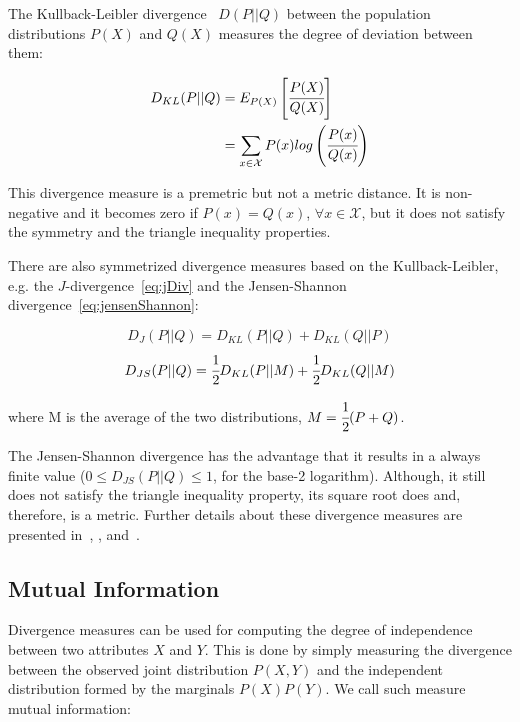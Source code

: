 The Kullback-Leibler divergence~\citep{Kullback51klDivergence} $D(P||Q)$ between the population
distributions $P(X)$ and $Q(X)$ measures the degree of deviation between them:

\begin{equation}
\begin{split}
 D_{KL}(P||Q)&=E_{P(X)}\left[\cfrac{P(X)}{Q(X)}\right] \\
 &=\sum_{x \in \mathcal{X}}P(x)log\left(\cfrac{P(x)}{Q(x)}\right)
\end{split} 
\end{equation}

This divergence measure is a premetric but not a metric distance. It is non-negative and it becomes zero if
$P(x)=Q(x)$,
$\forall x \in \mathcal{X}$, but it does not satisfy the symmetry and the triangle inequality properties.

There are also symmetrized divergence measures based on the Kullback-Leibler, e.g. the $J$-divergence~\ref{eq:jDiv} and
the Jensen-Shannon divergence~\ref{eq:jensenShannon}:

\begin{equation} \label{eq:jDiv}
  D_{J}(P||Q) = D_{KL}(P||Q) + D_{KL}(Q||P)
\end{equation}
\begin{equation} \label{eq:jensenShannon}
  D_{JS}(P||Q) = \cfrac{1}{2}D_{KL}(P||M) + \cfrac{1}{2}D_{KL}(Q||M)
\end{equation}

where M is the average of the two distributions, $M=\cfrac{1}{2}(P+Q)$.

The Jensen-Shannon divergence has the advantage that it results in a always finite value ($0 \leq
D_{JS}(P||Q) \leq 1$, for the base-2 logarithm). Although, it still does not satisfy the triangle inequality property,
its square root does and, therefore, is a metric. Further details about these divergence measures are presented
in~\citet{17795}, \citet{Vinh:2010:ITM:1953011.1953024}, and~\citet{guiasu1977information}.

\subsection{Mutual Information}

Divergence measures can be used for computing the degree of independence between two attributes $X$ and $Y$. This
is done by simply measuring the divergence between the observed joint distribution $P(X,Y)$ and the independent
distribution formed by the marginals $P(X)P(Y)$. We call such measure mutual information:

